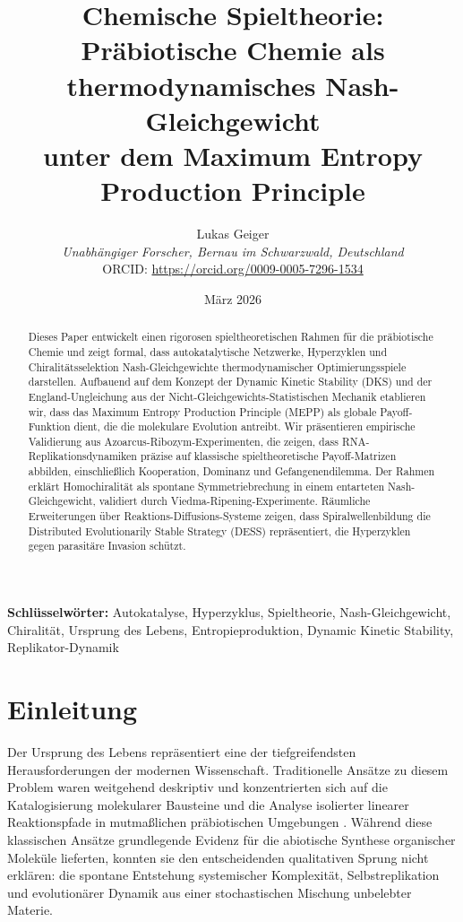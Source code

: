 \documentclass[12pt,a4paper]{article}
\title{Chemische Spieltheorie:\\
Pr\"abiotische Chemie als thermodynamisches Nash-Gleichgewicht\\
unter dem Maximum Entropy Production Principle}
\author{Lukas Geiger\\
\textit{Unabh\"angiger Forscher, Bernau im Schwarzwald, Deutschland}\\
ORCID: \url{https://orcid.org/0009-0005-7296-1534}}
\date{M\"arz 2026}
\theoremstyle{remark}
\begin{document}
\maketitle

\begin{abstract}
Dieses Paper entwickelt einen rigorosen spieltheoretischen Rahmen f\"ur die pr\"abiotische Chemie und zeigt formal, dass autokatalytische Netzwerke, Hyperzyklen und Chiralit\"atsselektion Nash-Gleichgewichte thermodynamischer Optimierungsspiele darstellen. Aufbauend auf dem Konzept der Dynamic Kinetic Stability (DKS) und der England-Ungleichung aus der Nicht-Gleichgewichts-Statistischen Mechanik etablieren wir, dass das Maximum Entropy Production Principle (MEPP) als globale Payoff-Funktion dient, die die molekulare Evolution antreibt. Wir pr\"asentieren empirische Validierung aus Azoarcus-Ribozym-Experimenten, die zeigen, dass RNA-Replikationsdynamiken pr\"azise auf klassische spieltheoretische Payoff-Matrizen abbilden, einschlie\ss{}lich Kooperation, Dominanz und Gefangenendilemma. Der Rahmen erkl\"art Homochiralit\"at als spontane Symmetriebrechung in einem entarteten Nash-Gleichgewicht, validiert durch Viedma-Ripening-Experimente. R\"aumliche Erweiterungen \"uber Reaktions-Diffusions-Systeme zeigen, dass Spiralwellenbildung die Distributed Evolutionarily Stable Strategy (DESS) repr\"asentiert, die Hyperzyklen gegen parasit\"are Invasion sch\"utzt.
\end{abstract}

\textbf{Schl\"usselw\"orter:} Autokatalyse, Hyperzyklus, Spieltheorie, Nash-Gleichgewicht, Chiralit\"at, Ursprung des Lebens, Entropieproduktion, Dynamic Kinetic Stability, Replikator-Dynamik

\section{Einleitung}
\label{sec:introduction}

Der Ursprung des Lebens repr\"asentiert eine der tiefgreifendsten Herausforderungen der modernen Wissenschaft. Traditionelle Ans\"atze zu diesem Problem waren weitgehend deskriptiv und konzentrierten sich auf die Katalogisierung molekularer Bausteine und die Analyse isolierter linearer Reaktionspfade in mutma\ss{}lichen pr\"abiotischen Umgebungen \citep{MillerUrey}. W\"ahrend diese klassischen Ans\"atze grundlegende Evidenz f\"ur die abiotische Synthese organischer Molek\"ule lieferten, konnten sie den entscheidenden qualitativen Sprung nicht erkl\"aren: die spontane Entstehung systemischer Komplexit\"at, Selbstreplikation und evolution\"arer Dynamik aus einer stochastischen Mischung unbelebter Materie.
\end{document}
